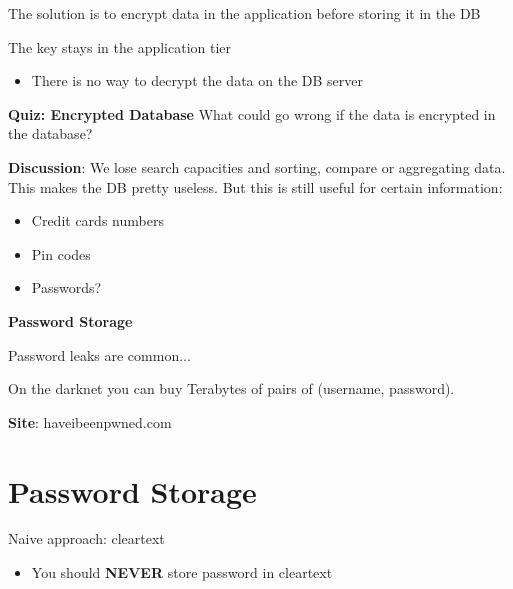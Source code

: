 \documentclass[11pt]{article}
\begin{document}
The solution is to encrypt data in the application before storing it in the DB

The key stays in the application tier
\begin{itemize}
	\item There is no way to decrypt the data on the DB server
\end{itemize}

\begin{tcolorbox}[
  colback=gray!15,     %
  colframe=black!50,    %
  boxrule=1pt,       %
  arc=3mm,             %
  left=4mm, right=4mm, top=2mm, bottom=2mm %
]
\textbf{Quiz: Encrypted Database}
What could go wrong if the data is encrypted in the database?
\vspace{0.3cm}

\textbf{Discussion}: We lose search capacities and sorting, compare or aggregating data. \\

This makes the DB pretty useless. But this is still useful for certain information:
\begin{itemize}
	\item Credit cards numbers
	\item Pin codes
	\item Passwords?
\end{itemize}
\end{tcolorbox}

\vspace{1cm}
\begin{center}
  {\LARGE \textbf{Password Storage}}
\end{center}

\vspace{1cm}

Password leaks are common...

On the darknet you can buy Terabytes of pairs of (username, password). 

\textbf{Site}: haveibeenpwned.com

\section*{Password Storage}

Naive approach: cleartext
\begin{itemize}
	\item You should \textbf{NEVER} store password in cleartext
\end{itemize}
\end{document}
